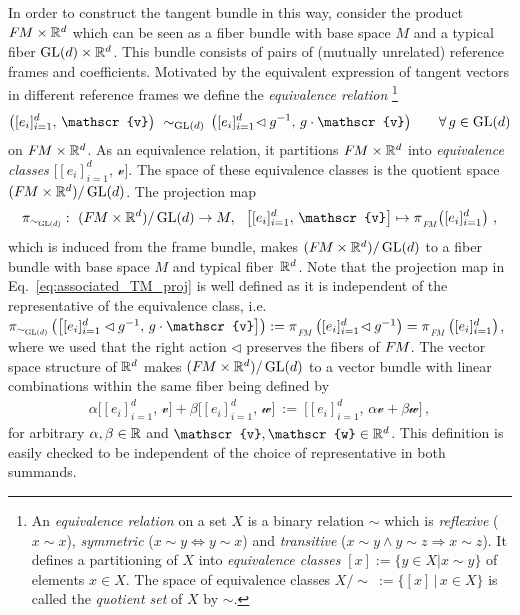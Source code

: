 In order to construct the tangent bundle in this way, consider the product $F\mkern-1.5muM\times\mathbb{R}^d$ which can be seen as a fiber bundle with base space $M$ and a typical fiber $\operatorname{GL}(d)\times\mathbb{R}^d$.
This bundle consists of pairs of (mutually unrelated) reference frames and coefficients.
Motivated by the equivalent expression of tangent vectors in different reference frames we define the \emph{equivalence relation}%
\footnote{\label{footnote:equiv_rel}%
    An \emph{equivalence relation} on a set $X$ is a binary relation $\sim$ which is
    \emph{reflexive} ($x\!\sim\! x$),
    \emph{symmetric} ($x\!\sim\! y \Leftrightarrow y\!\sim\! x$) and
    \emph{transitive} ($x\!\sim\! y \wedge y\!\sim\! z \Rightarrow x\!\sim\! z$).
    It defines a partitioning of $X$ into \emph{equivalence classes} $[x] := \{y\in X | x\sim y\}$ of elements $x\in X$.
    The space of equivalence classes $X/\!\!\sim\ := \{[x] \,|\, x\in X\}$ is called the \emph{quotient set} of $X$ by $\sim$.
}
\begin{align}\label{eq:equiv_relation_TM}
    \big([e_i]_{i=1}^d,\,\mathscr{v}\big)\ \sim_{\GL{d}}\, \big([e_i]_{i=1}^d\!\lhd g^{-1},\, g\cdot \mathscr{v}\big) \qquad\forall\, g\in \GL{d}
\end{align}
on $F\mkern-1.5muM\times\mathbb{R}^d$.
As an equivalence relation, it partitions $F\mkern-1.5muM\times\mathbb{R}^d$ into \emph{equivalence classes} $\big[[e_i]_{i=1}^d,\,\mathscr{v}\big]$.
The space of these equivalence classes is the quotient space $(F\mkern-1.5muM\times\mathbb{R}^d)/\operatorname{GL}(d)$.
The projection map
\begin{align}\label{eq:associated_TM_proj}
    \pi_{\scalebox{.75}{$\sim_{\GL{d}}$}}:\ 
    (\FM\times\R^d)/\GL{d} \to M,\ \ 
    \big[[e_i]_{i=1}^d,\,\mathscr{v}\big] \mapsto \piFM\!\left([e_i]_{i=1}^d\right) \,,
\end{align}
which is induced from the frame bundle, makes $(F\mkern-1.5muM\times\mathbb{R}^d)/\operatorname{GL}(d)$ to a fiber bundle with base space $M$ and typical fiber~$\mathbb{R}^d$.
Note that the projection map in Eq.~\eqref{eq:associated_TM_proj} is well defined as it is independent of the representative of the equivalence class, i.e.
$\pi_{\scalebox{.75}{$\sim_{\GL{d}}$}}\left(\big[[e_i]_{i=1}^d\lhd g^{-1},\, g\cdot \mathscr{v}\big]\right) := \piFM\left([e_i]_{i=1}^d\!\lhd g^{-1}\right) = \piFM\left([e_i]_{i=1}^d\right)$,
where we used that the right action $\lhd$ preserves the fibers of $F\mkern-1.5muM$.
The vector space structure of $\mathbb{R}^d$ makes $(F\mkern-1.5muM\times\mathbb{R}^d)/\operatorname{GL}(d)$ to a vector bundle with linear combinations within the same fiber being defined by
\begin{align}\label{eq:associated_bdl_linear_combination}
    \alpha \big[[e_i]_{i=1}^d,\,\mathscr{v}\big] + \beta \big[[e_i]_{i=1}^d,\,\mathscr{w}\big]
    \ :=\ \big[[e_i]_{i=1}^d,\,\alpha\mathscr{v} + \beta\mathscr{w} \big] \,,
\end{align}
for arbitrary $\alpha,\beta\in\mathbb{R}$ and $\mathscr{v},\mathscr{w}\in\R^d$.
This definition is easily checked to be independent of the choice of representative in both summands.

